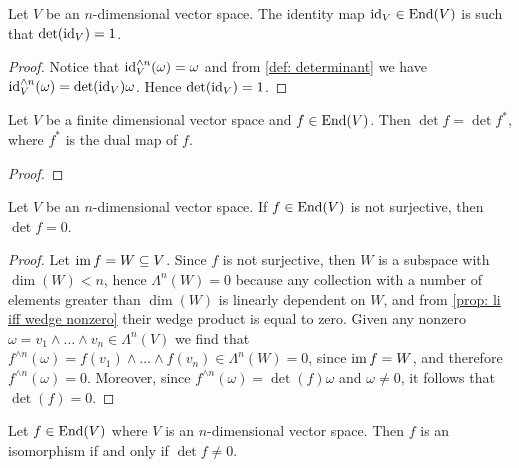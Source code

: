 \begin{proposition}\label{prop: id det}
  Let \(V\) be an \(n\)-dimensional vector space. The identity map \(\operatorname{id}_V \in
  \operatorname{End}(V)\) is such that \(\det(\operatorname{id}_V) = 1\).
\end{proposition}

\begin{proof}
  Notice that \(\operatorname{id}_V^{\wedge n}(\omega) = \omega\) and from \cref{def:
  determinant} we have \(\operatorname{id}_V^{\wedge n}(\omega) = \det(\operatorname{id}_V) \omega\). Hence
  \(\det(\operatorname{id}_V) = 1\).
\end{proof}

\begin{proposition}
  Let \(V\) be a finite dimensional vector space and \(f \in \operatorname{End}(V)\). Then
  \(\det f = \det f^*\), where \(f^*\) is the dual map of \(f\).
\end{proposition}

\begin{proof}

\end{proof}



\begin{lemma}\label{lem: not surjective 0 det}
  Let \(V\) be an \(n\)-dimensional vector space. If \(f \in \operatorname{End}(V)\) is not
  surjective, then \(\det f = 0\).
\end{lemma}

\begin{proof}
  Let \(\operatorname{im} f = W \subseteq V\). Since \(f\) is not surjective, then \(W\) is a
  subspace with \(\dim(W) < n\), hence \(\Lambda^n(W) = 0\) because any
  collection with a number of elements greater than \(\dim(W)\) is linearly
  dependent on \(W\), and from \cref{prop: li iff wedge nonzero} their wedge
  product is equal to zero. Given any nonzero \(\omega = v_1 \wedge \dots \wedge
  v_n \in \Lambda^n(V)\) we find that \(f^{\wedge n}(\omega) = f(v_1) \wedge
  \dots \wedge f(v_n) \in \Lambda^n(W) = 0\), since \(\operatorname{im} f = W\), and therefore
  \(f^{\wedge n}(\omega) = 0\). Moreover, since \(f^{\wedge n}(\omega) = \det(f)
  \omega\) and \(\omega \neq 0\), it follows that \(\det(f) = 0\).
\end{proof}

\begin{proposition}
  \label{prop: iso det}
  Let \(f \in \operatorname{End}(V)\) where \(V\) is an \(n\)-dimensional vector space. Then
  \(f\) is an isomorphism if and only if \(\det f \neq 0\).
\end{proposition}

